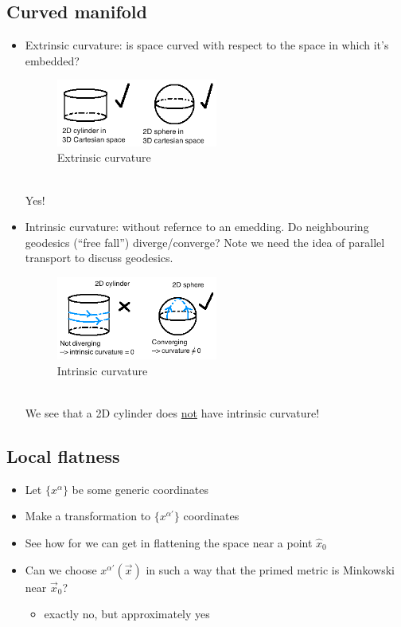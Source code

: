 \documentclass[a4paper]{article} %
\begin{document}
\subsection{Curved manifold}
\begin{itemize}
\item Extrinsic curvature: is space curved with respect to the space in which it's embedded?
\begin{figure}[h]
\centering
\includegraphics[width=0.5\textwidth]{images/extrinsic-curvature.png}
\caption{Extrinsic curvature}
\end{figure}\\
Yes!
\item Intrinsic curvature: without refernce to an emedding. Do neighbouring geodesics (``free fall'') diverge/converge? Note we need the idea of parallel transport to discuss geodesics.
\begin{figure}[h]
\centering
\includegraphics[width=0.5\textwidth]{images/intrinsic-curvature.png}
\caption{Intrinsic curvature}
\end{figure}\\
We see that a 2D cylinder does \underline{not} have intrinsic curvature!
\end{itemize}

\subsection{Local flatness}
\begin{itemize}
\item Let $\{x^{\alpha}\}$ be some generic coordinates
\item Make a transformation to $\{x^{\alpha'}\}$ coordinates
\item See how for we can get in flattening the space near a point $\hat{x}_0$
\item Can we choose $x^{\alpha'}(\vec{x})$ in such a way that the primed metric is Minkowski near $\vec{x}_0$?
\begin{itemize}
\item exactly no, but approximately yes
\end{itemize}
\end{itemize}
\end{document}
